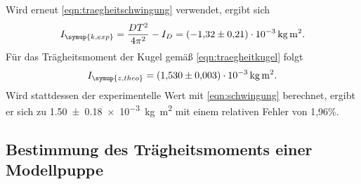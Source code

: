 Wird erneut \eqref{eqn:traegheitschwingung} verwendet, ergibt sich
\begin{equation}
  I_{\symup{k,exp}} = \frac{DT^2}{4\pi^2}-I_D = \SI{-1.32(021)e-3}{\kilogram\meter\squared}.
\end{equation}
Für das Trägheitsmoment der Kugel gemäß \eqref{eqn:traegheitkugel} folgt
\begin{equation}
  I_{\symup{z,theo}} = \SI{1.530(0003)e-3}{\kilogram\meter\squared}.
\end{equation}
Wird stattdessen der experimentelle Wert mit \eqref{eqn:schwingung} berechnet,
ergibt er sich zu \SI{1.50(018)e-3}{\kilogram\meter\squared} mit einem relativen
Fehler von 1,96\%.

\subsection{Bestimmung des Trägheitsmoments einer Modellpuppe}
